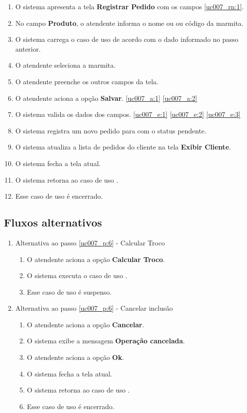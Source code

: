 \begin{enumerate}[label=P\arabic*]
	\item O sistema apresenta a tela \textbf{Registrar Pedido} com os campos \ref{uc007_rn:1}. \label{uc007_p:1}
	\item No campo \textbf{Produto}, o atendente informa o nome ou ou código da marmita. \label{uc007_p:2}
	\item O sistema carrega o caso de uso  de acordo com o dado informado no passo anterior.
	\item O atendente seleciona a marmita. \label{uc007_p:4}
	\item O atendente preenche os outros campos da tela. \label{uc007_p:5}	
	\item O atendente aciona a opção \textbf{Salvar}. \label{uc007_p:6}\ref{uc007_a:1} \ref{uc007_a:2}
	\item O sistema valida os dados dos campos. \ref{uc007_e:1} \ref{uc007_e:2} \ref{uc007_e:3}
	\item O sistema registra um novo pedido para com o status pendente.
	\item O sistema atualiza a lista de pedidos do cliente na tela \textbf{Exibir Cliente}.
	\item O sistema fecha a tela atual.
	\item O sistema retorna ao caso de uso .
	\item Esse caso de uso é encerrado.	
\end{enumerate}

\subsection{Fluxos alternativos}

\begin{enumerate}[label=A\arabic*]
	\item Alternativa ao passo \ref{uc007_p:6} - Calcular Troco \label{uc007_a:1}
	\begin{enumerate}[label*=.\arabic*]
		\item O atendente aciona a opção \textbf{Calcular Troco}.
		\item O sistema executa o caso de uso .
		\item Esse caso de uso é suspenso.
	\end{enumerate} 
		
	\item Alternativa ao passo \ref{uc007_p:6} - Cancelar inclusão \label{uc007_a:2}
	\begin{enumerate}[label*=.\arabic*]
		\item O atendente aciona a opção \textbf{Cancelar}.
		\item O sistema exibe a mensagem \textbf{Operação cancelada}.
		\item O atendente aciona a opção \textbf{Ok}.
		\item O sistema fecha a tela atual.
		\item O sistema retorna ao caso de uso .
		\item Esse caso de uso é encerrado.
	\end{enumerate} 	
\end{enumerate}

